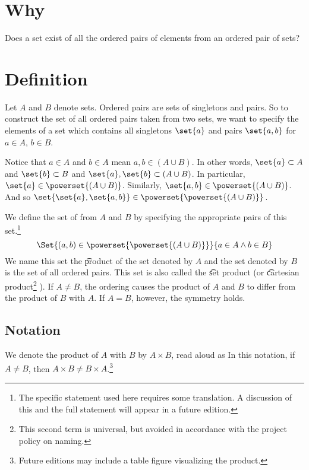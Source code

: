 

\section*{Why}

Does a set exist of all the ordered pairs of elements from an ordered pair of sets?

\section*{Definition}

Let $A$ and $B$ denote sets.
Ordered pairs are sets of singletons and pairs.
So to construct the set of all ordered pairs taken from two sets, we want to specify the elements of a set which contains all singletons $\set{a}$ and pairs $\set{a, b}$ for $a \in A$, $b \in B$.

Notice that $a \in A$ and $b \in A$ mean $a, b \in (A \cup B)$.
In other words, $\set{a} \subset A$ and $\set{b} \subset B$ and $\set{a}, \set{b} \subset (A \cup B)$.
In particular, $\set{a} \in \powerset{(A \cup B)}$.
Similarly, $\set{a, b} \in \powerset{(A \cup B)}$.
And so $\set{\set{a}, \set{a, b}} \in \powerset{\powerset{(A \cup B)}}$.

We define the set of  from $A$ and $B$ by specifying the appropriate pairs of this set.\footnote{The specific statement used here requires some translation. A discussion of this and the full statement will appear in a future edition.}
  \[
\Set{(a, b) \in \powerset{\powerset{(A \cup B)}}}{a \in A \land b \in B}
  \]
We name this set the \t{product} of the set denoted by $A$ and the set denoted by $B$ is the set of all ordered pairs.
This set is also called the \t{set product} (or \t{cartesian product}\footnote{This second term is universal, but avoided in accordance with the project policy on naming.}
).
If $A \neq B$, the ordering causes the product of $A$ and $B$ to differ from the product of
$B$ with $A$.
If $A = B$, however, the symmetry holds.

\subsection*{Notation}

We denote the product of $A$ with $B$ by $A \times  B$, read aloud as 
In this notation, if $A \neq B$, then $A \times  B \neq B \times  A$.\footnote{Future editions may include a table figure visualizing the product.}
